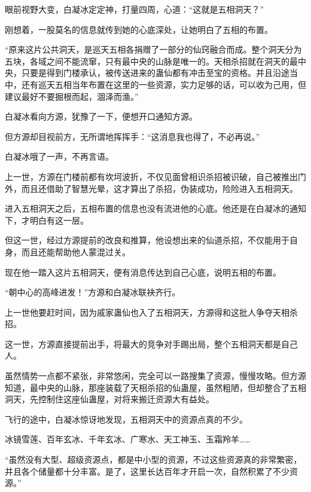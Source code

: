 
\begin{this_body}



眼前视野大变，白凝冰定定神，打量四周，心道：“这就是五相洞天？”

刚想着，一股莫名的信息就传到她的心底深处，让她明白了五相的布置。

“原来这片公共洞天，是巡天五相各捐赠了一部分的仙窍融合而成。整个洞天分为五块，各域之间不能流窜，只有最中央的山脉是唯一的。天相杀招就在洞天的最中央，只要是得到门楼承认，被传送进来的蛊仙都有冲击至宝的资格。并且沿途当中，还有巡天五相当年布置在这里的一些资源，实力足够的话，可以收为己用，但建议最好不要掘根而起，涸泽而渔。”

白凝冰看向方源，犹豫了一下，便想开口通知方源。

但方源却目视前方，无所谓地挥挥手：“这消息我也得了，不必再说。”

白凝冰哦了一声，不再言语。

上一世，方源在门楼前都有坎坷波折，不仅见面曾相识杀招被识破，自己被推出门外，而且还借助了智慧光晕，这才算出了杀招，伪装成功，险险进入五相洞天。

进入五相洞天之后，五相布置的信息也没有流进他的心底。他还是在白凝冰的通知下，才明白有这一层。

但这一世，经过方源提前的改良和推算，他设想出来的仙道杀招，不仅能用于自身，而且还能帮助他人蒙混过关。

现在他一踏入这片五相洞天，便有消息传达到自己心底，说明五相的布置。

“朝中心的高峰进发！”方源和白凝冰联袂齐行。

上一世他要赶时间，因为戚家蛊仙也入了五相洞天，方源得和这批人争夺天相杀招。

这一世，方源直接提前出手，将最大的竞争对手踢出局，整个五相洞天都是自己人。

虽然情势一点都不紧张，非常悠闲，完全可以一路搜集了资源，慢慢攻略。但方源知道，最中央的山脉，那座装载了天相杀招的仙蛊屋，虽然粗陋，但却整合了五相洞天，先控制住这座仙蛊屋，对将来搬迁资源大有益处。

飞行的途中，白凝冰惊讶地发现，五相洞天中的资源点真的不少。

冰镜雪莲、百年玄冰、千年玄冰、广寒水、天工神玉、玉霜羚羊……

“虽然没有大型、超级资源点，都是中小型的资源，不过这些资源真的非常繁密，并且各个储量都十分丰富。是了，这里长达百年才开启一次，自然积累了不少资源。”


\end{this_body}
